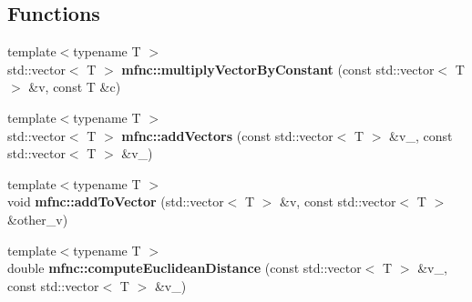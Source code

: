 \subsection*{Functions}
\begin{DoxyCompactItemize}
\item 
{\footnotesize template$<$typename T $>$ }\\std\+::vector$<$ T $>$ \textbf{ mfnc\+::multiply\+Vector\+By\+Constant} (const std\+::vector$<$ T $>$ \&v, const T \&c)
\item 
{\footnotesize template$<$typename T $>$ }\\std\+::vector$<$ T $>$ \textbf{ mfnc\+::add\+Vectors} (const std\+::vector$<$ T $>$ \&v\+\_, const std\+::vector$<$ T $>$ \&v\+\_)
\item 
{\footnotesize template$<$typename T $>$ }\\void \textbf{ mfnc\+::add\+To\+Vector} (std\+::vector$<$ T $>$ \&v, const std\+::vector$<$ T $>$ \&other\+\_\+v)
\item 
{\footnotesize template$<$typename T $>$ }\\double \textbf{ mfnc\+::compute\+Euclidean\+Distance} (const std\+::vector$<$ T $>$ \&v\+\_, const std\+::vector$<$ T $>$ \&v\+\_)
\end{DoxyCompactItemize}
